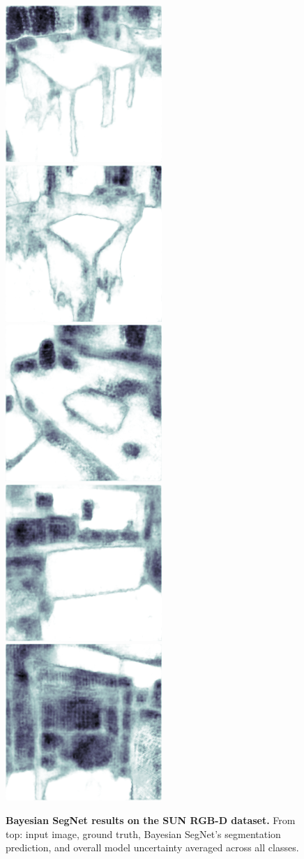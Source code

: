 \begin{figure}[p]
\begin{center}
{\includegraphics[height=0.125\linewidth]{BayesianSegNet/segnet_bayes_00375_uncertainty.png}
\includegraphics[height=0.125\linewidth]{BayesianSegNet/segnet_bayes_00461_uncertainty.png}
\includegraphics[height=0.125\linewidth]{BayesianSegNet/segnet_bayes_00116_uncertainty.png}
\includegraphics[height=0.125\linewidth]{BayesianSegNet/segnet_bayes_01035_uncertainty.png}
\includegraphics[height=0.125\linewidth]{BayesianSegNet/segnet_bayes_00856_uncertainty.png}
}
\end{center}
\caption[Bayesian SegNet results on the SUN RGB-D dataset.]{\footnotesize \textbf{Bayesian SegNet results on the SUN RGB-D dataset.} From top: input image, ground truth, Bayesian SegNet's segmentation prediction, and overall model uncertainty averaged across all classes.}
\label{fig:qual_sun}


\end{figure}

